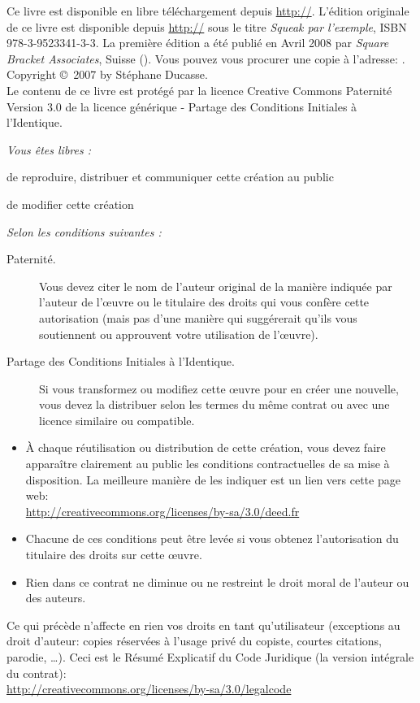 \documentclass[a4paper,10pt,twoside]{book}
\begin{document}
\begin{footnotesize}
\setlength{\parindent}{0pt}
Ce livre est disponible en libre t\'el\'echargement depuis
\url{http://}. L'édition originale de ce livre est
disponible depuis \url{http://} sous le titre
\emph{Squeak par l'exemple}, ISBN 978-3-9523341-3-3. La première édition
a été publié en Avril 2008 par 
\emph{Square Bracket Associates}, Suisse
(\sba). Vous pouvez vous procurer une
copie à l'adresse: \spe.\\[1cm]

Copyright \copyright~2007 by St\'ephane Ducasse.\\[1cm]

Le contenu de ce livre est prot\'eg\'e par la licence Creative Commons
Paternit\'e Version 3.0 de la licence g\'en\'erique - Partage des Conditions Initiales \`a l'Identique.

\emph{Vous \^etes libres :}
\begin{description}
  \item de reproduire, distribuer et communiquer cette cr\'eation au public
  \item de modifier cette cr\'eation
\end{description}
\emph{Selon les conditions suivantes :}
\begin{description}
  \item[Paternit\'e.] Vous devez citer le nom de l'auteur original de la mani\`ere indiqu\'ee par l'auteur de l'\oe{}uvre ou le titulaire des droits qui vous conf\`ere cette autorisation (mais pas d'une mani\`ere qui sugg\'ererait qu'ils vous soutiennent ou approuvent votre utilisation de l'\oe{}uvre).
  \item[Partage des Conditions Initiales \`a l'Identique.] Si vous transformez ou modifiez cette \oe{}uvre pour en cr\'eer une nouvelle, vous devez la distribuer selon les termes du m\^eme contrat ou avec une licence similaire ou compatible.
\end{description}
\begin{itemize}
  \item \`A chaque r\'eutilisation ou distribution de cette cr\'eation, vous devez faire appara\^itre clairement au public les conditions contractuelles de sa mise \`a disposition. La meilleure mani\`ere de les indiquer est un lien vers cette page web:\\
  \url{http://creativecommons.org/licenses/by-sa/3.0/deed.fr}
  \item Chacune de ces conditions peut \^etre lev\'ee si vous obtenez l'autorisation du titulaire des droits sur cette \oe{}uvre.
  \item Rien dans ce contrat ne diminue ou ne restreint le droit moral de l'auteur ou des auteurs.
\end{itemize}
\quad
\parbox{\textwidth-2cm-1em}{
	Ce qui pr\'ec\`ede n'affecte en rien vos droits en tant qu'utilisateur (exceptions au droit d'auteur: copies r\'eserv\'ees \`a l'usage priv\'e du copiste, courtes citations, parodie, \ldots).
	Ceci est le R\'esum\'e Explicatif du Code Juridique (la version int\'egrale du contrat):\\
\url{http://creativecommons.org/licenses/by-sa/3.0/legalcode}}
\end{footnotesize}
\end{document}
